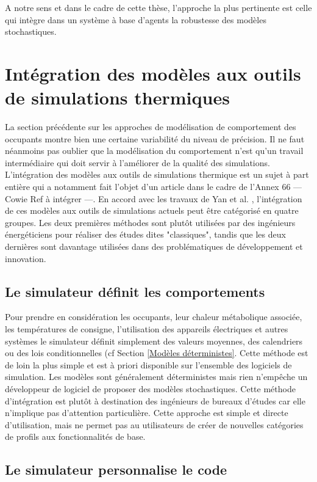 A notre sens et dans le cadre de cette thèse, l'approche la plus pertinente est celle qui intègre dans un système à base d'agents la robustesse des modèles stochastiques. 

\section{Intégration des modèles aux outils de simulations thermiques}

La section précédente sur les approches de modélisation de comportement des occupants montre bien une certaine variabilité du niveau de précision. Il ne faut néanmoins pas oublier que la modélisation du comportement n'est qu'un travail intermédiaire qui doit servir à l'améliorer de la qualité des simulations. L'intégration des modèles aux outils de simulations thermique est un sujet à part entière qui a notamment fait l'objet d'un article dans le cadre de l'Annex 66 --- Cowie Ref à intégrer ---. En accord avec les travaux de Yan et al. \cite{Yan-15}, l'intégration de ces modèles aux outils de simulations actuels peut être catégorisé en quatre groupes. Les deux premières méthodes sont plutôt utilisées par des ingénieurs énergéticiens pour réaliser des études dites "classiques", tandis que les deux dernières sont davantage utilisées dans des problématiques de développement et innovation.

\subsection{Le simulateur définit les comportements}

Pour prendre en considération les occupants, leur chaleur métabolique associée, les températures de consigne, l'utilisation des appareils électriques et autres systèmes le simulateur définit simplement des valeurs moyennes, des calendriers ou des lois conditionnelles (cf Section \ref{Modèles déterministes}. Cette méthode est de loin la plus simple et est à priori disponible sur l'ensemble des logiciels de simulation. Les modèles sont généralement déterministes mais rien n'empêche un développeur de logiciel de proposer des modèles stochastiques. Cette méthode d'intégration est plutôt à destination des ingénieurs de bureaux d'études car elle n'implique pas d'attention particulière. Cette approche est simple et directe d'utilisation, mais ne permet pas au utilisateurs de créer de nouvelles catégories de profils aux fonctionnalités de base.

\subsection{Le simulateur personnalise le code}
\label{Le simulateur personnalise le code}

